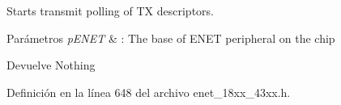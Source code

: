 Starts transmit polling of TX descriptors. 


\begin{DoxyParams}{Parámetros}
{\em p\+E\+N\+ET} & \+: The base of E\+N\+ET peripheral on the chip \\
\hline
\end{DoxyParams}
\begin{DoxyReturn}{Devuelve}
Nothing 
\end{DoxyReturn}


Definición en la línea 648 del archivo enet\+\_\+18xx\+\_\+43xx.\+h.

